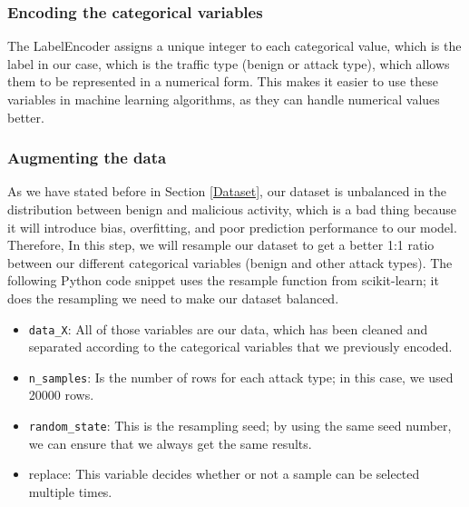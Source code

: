 \subsubsection{Encoding the categorical variables}
The LabelEncoder assigns a unique integer to each categorical value, which is the label in our case, which is the traffic type (benign or attack type), which allows them to be represented in a numerical form. This makes it easier to use these variables in machine learning algorithms, as they can handle numerical values better.









\subsubsection{Augmenting the data}
As we have stated before in Section \ref{Dataset}, our dataset is unbalanced in the distribution between benign and malicious activity, which is a bad thing because it will introduce bias, overfitting, and poor prediction performance to our model. Therefore, In this step, we will resample our dataset to get a better 1:1 ratio between our different categorical variables (benign and other attack types). The following Python code snippet uses the resample function from scikit-learn; it does the resampling we need to make our dataset balanced.








\begin{itemize}
	\item \texttt{data\_X}:  All of those variables are our data, which has been cleaned and separated according to the categorical variables that we previously encoded.
	\item \texttt{n\_samples}: Is the number of rows for each attack type; in this case, we used 20000 rows.
	\item \texttt{random\_state}: This is the resampling seed; by using the same seed number, we can ensure that we always get the same results.
	\item replace: This variable decides whether or not a sample can be selected multiple times.
\end{itemize}



